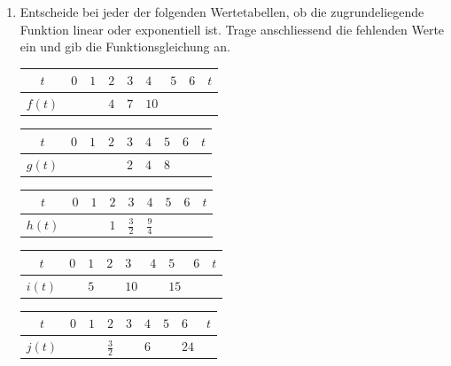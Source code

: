 \documentclass[11pt,oneside]{article}
\begin{document}
	\begin{aufgabe}
		\begin{enumerate}
			\item Entscheide bei jeder der folgenden Wertetabellen, ob die zugrundeliegende Funktion linear oder exponentiell ist. Trage anschliessend die fehlenden Werte ein und gib die Funktionsgleichung an.
			\begin{table}[H]
				\centering
				\begin{tabular}{c|p{8mm}|p{8mm}|p{8mm}|p{8mm}|p{8mm}|p{8mm}|p{8mm}|p{8mm}}
					$t$ & $0$ & $1$ & $2$ & $3$ & $4$ & $5$ & $6$ & $t$ \\\hline
					$f(t)$ & & & $4$ & $7$ & $10$ & &
				\end{tabular}
			\end{table}
			\begin{table}[H]
				\centering
				\begin{tabular}{c|p{8mm}|p{8mm}|p{8mm}|p{8mm}|p{8mm}|p{8mm}|p{8mm}|p{8mm}}
					$t$ & $0$ & $1$ & $2$ & $3$ & $4$ & $5$ & $6$ & $t$ \\\hline
					$g(t)$ & & & & $2$ & $4$ & $8$ & &
				\end{tabular}
			\end{table}
			\begin{table}[H]
				\centering
				\begin{tabular}{c|p{8mm}|p{8mm}|p{8mm}|p{8mm}|p{8mm}|p{8mm}|p{8mm}|p{8mm}}
					$t$ & $0$ & $1$ & $2$ & $3$ & $4$ & $5$ & $6$ & $t$ \\\hline
					$h(t)$ & & & $1$ & $\frac{3}{2}$ & $\frac{9}{4}$ & & &
				\end{tabular}
			\end{table}
			\begin{table}[H]
				\centering
				\begin{tabular}{c|p{8mm}|p{8mm}|p{8mm}|p{8mm}|p{8mm}|p{8mm}|p{8mm}|p{8mm}}
					$t$ & $0$ & $1$ & $2$ & $3$ & $4$ & $5$ & $6$ & $t$ \\\hline
					$i(t)$ & & $5$ & & $10$ & & $15$ & &
				\end{tabular}
			\end{table}
			\begin{table}[H]
				\centering
				\begin{tabular}{c|p{8mm}|p{8mm}|p{8mm}|p{8mm}|p{8mm}|p{8mm}|p{8mm}|p{8mm}}
					$t$ & $0$ & $1$ & $2$ & $3$ & $4$ & $5$ & $6$ & $t$ \\\hline
					$j(t)$ & & & $\frac{3}{2}$ & & $6$ & & $24$ &
				\end{tabular}

\end{table}
\end{enumerate}
\end{aufgabe}
\end{document}
